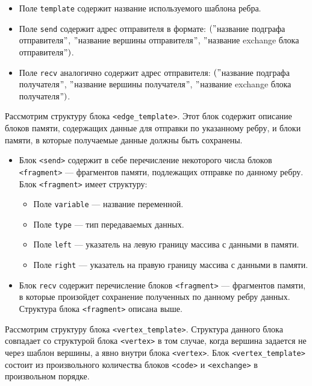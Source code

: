 \documentclass[a4paper, 12pt]{article}
\begin{document}
	\begin{itemize}
		\item Поле \lstinline$template$ содержит название используемого шаблона ребра.
		\item Поле \lstinline$send$ содержит адрес отправителя в формате: $("$название подграфа отправителя$"$, $"$название вершины отправителя$"$, $"$название exchange блока отправителя$")$.
		\item Поле \lstinline$recv$ аналогично содержит адрес отправителя: $("$название подграфа получателя$"$, $"$название вершины получателя$"$, $"$название exchange блока получателя$")$.
	\end{itemize}
	Рассмотрим структуру блока \lstinline$<edge_template>$. Этот блок содержит описание блоков памяти, содержащих данные для отправки по указанному ребру, и блоки памяти, в которые получаемые данные должны быть сохранены.
	\begin{itemize}
		\item Блок \lstinline$<send>$ содержит в себе перечисление некоторого числа блоков \lstinline$<fragment>$ ---  фрагментов памяти, подлежащих отправке по данному ребру. Блок \lstinline$<fragment>$ имеет структуру:
		\begin{itemize}
			\item Поле \lstinline$variable$ --- название переменной.
			\item Поле \lstinline$type$ --- тип передаваемых данных.
			\item Поле \lstinline$left$ ---  указатель на левую границу массива с данными в памяти.
			\item Поле \lstinline$right$ ---  указатель на правую границу массива с данными в памяти.
		\end{itemize}
		\item Блок \lstinline$recv$ содержит перечисление блоков \lstinline$<fragment>$ --- фрагментов памяти, в которые произойдет сохранение полученных по данному ребру данных. Структура блока \lstinline$<fragment>$ описана выше.
	\end{itemize}
	Рассмотрим структуру блока \lstinline$<vertex_template>$. Структура данного блока совпадает со структурой блока \lstinline$<vertex>$ в том случае, когда вершина задается не через шаблон вершины, а явно внутри блока \lstinline$<vertex>$. Блок \lstinline$<vertex_template>$ состоит из произвольного количества блоков \lstinline$<code>$ и \lstinline$<exchange>$ в произвольном порядке.
\end{document}
